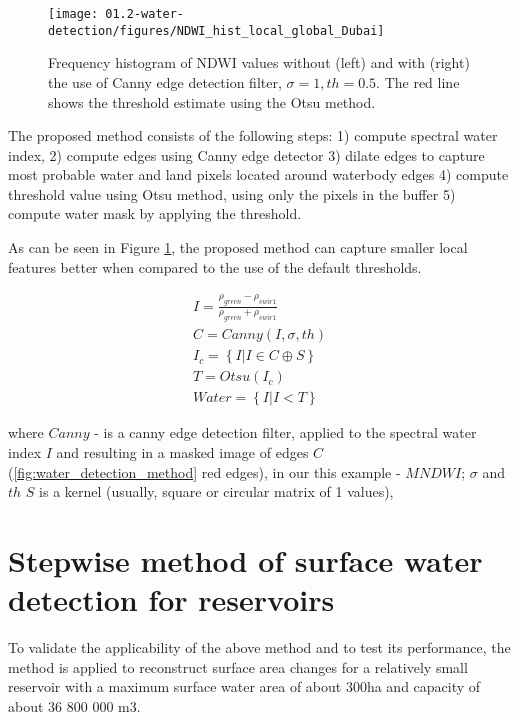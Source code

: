 \begin{figure}
	\centering
	\texttt{[image: 01.2-water-detection/figures/NDWI\_hist\_local\_global\_Dubai]}
	\caption{Frequency histogram of NDWI values without (left) and with (right) the use of Canny edge detection filter, $\sigma=1, th=0.5$. The red line shows the threshold estimate using the Otsu method.}
	\label{fig:water_detection_method_local_water_hist_Dubai}
\end{figure}

The proposed method consists of the following steps: 1) compute spectral water index, 2) compute edges using Canny edge detector 3) dilate edges to capture most probable water and land pixels located around waterbody edges 4) compute threshold value using Otsu method, using only the pixels in the buffer 5) compute water mask by applying the threshold.

As can be seen in Figure \ref{fig:water_detection_method_local_water_hist_Dubai}, the proposed method can capture smaller local features better when compared to the use of the default thresholds.


\begin{gather}
I=\frac{\rho_{green}-\rho_{swir1}}{\rho_{green}+\rho_{swir1}} \\
C=Canny(I,\sigma,th) \\
I_c=\left\{ I | I \in C \oplus S \right\} \\
T=Otsu(I_c) \\
Water = \left\{ I | I < T \right\}
\end{gather}


where $Canny$ - is a canny edge detection filter, applied to the spectral water index $I$ and resulting in a masked image of edges $C$ (\ref{fig:water_detection_method} red edges), in our this example - $MNDWI$; $\sigma$ and $th$  $S$ is a kernel (usually, square or circular matrix of 1 values), 

\section{Stepwise method of surface water detection for reservoirs}

To validate the applicability of the above method and to test its performance, the method is applied to reconstruct surface area changes for a relatively small reservoir with a maximum surface water area of about 300ha and capacity of about 36 800 000 m3. 

